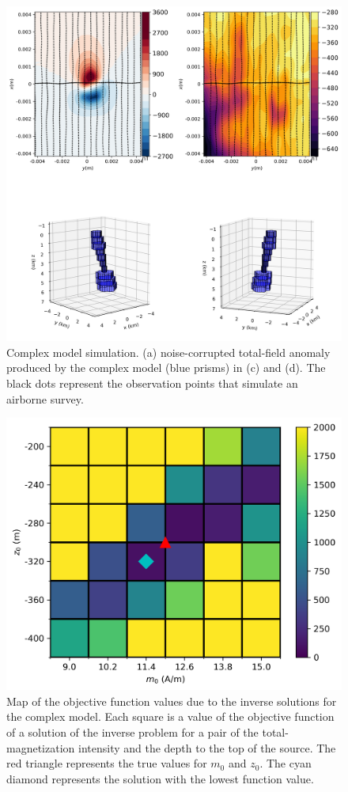 \begin{figure}
    \centering
    \includegraphics[scale=.5]{figures/complex_model_data.png}
    \caption{Complex model simulation. (a) noise-corrupted total-field anomaly produced by the complex model (blue prisms) in (c) and (d). The black dots represent the observation points that simulate an airborne survey.
}
    \label{fig:complex_model}
\end{figure}

\begin{figure}
	\centering
	\includegraphics[scale=.75]{figures/complex_obj_func_map.png}
	\caption{Map of the objective function values due to the inverse solutions for the complex model. Each square is a value of the objective function of a solution of the inverse problem for a pair of the total-magnetization intensity and the depth to the top of the source. The red triangle represents the true values for $m_0$ and $z_0$. The cyan diamond represents the solution with the lowest function value.
	}
	\label{fig:complex_map}
\end{figure}

